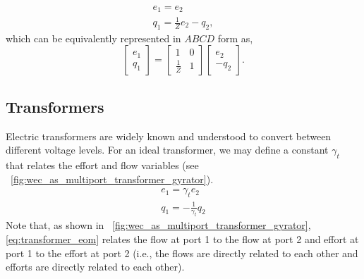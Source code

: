 \documentclass[lettersize,journal]{IEEEtran}
\begin{document}
\begin{subequations}
        \begin{gather}
                e_1 =  e_2 \\
                q_1 = \frac{1}{Z} e_2 - q_2 ,
        \end{gather}
        \label{eq:parallel_impedance_eom}%
\end{subequations}
%
which can be equivalently represented in $ABCD$ form as,
%
\begin{equation}
        \begin{bmatrix}
                e_1 \\ q_1
        \end{bmatrix}
        =
        \begin{bmatrix}
                1 & 0 \\ \frac{1}{Z} & 1
        \end{bmatrix}
        \begin{bmatrix}
                e_2 \\ - q_2
        \end{bmatrix} .
        \label{eq:parallel_impedance_abcd}
\end{equation}

\subsection{Transformers}\label{sec:trasnformers}
Electric transformers are widely known and understood to convert between different voltage levels.
For an ideal transformer, we may define a constant $\gamma_{t}$ that relates the effort and flow variables (see \figurename~\ref{fig:wec_as_multiport_transformer_gyrator}).
%
\begin{subequations}
        \begin{align}
               e_1 = \gamma_{t} e_2 \\
               q_1 = -\frac{1}{\gamma_t} q_2
        \end{align}
        \label{eq:transformer_eom}%
\end{subequations}
%
Note that, as shown in \figurename~\ref{fig:wec_as_multiport_transformer_gyrator}, \eqref{eq:transformer_eom} relates the flow at port 1 to the flow at port 2 and effort at port 1 to the effort at port 2 (i.e., the flows are directly related to each other and efforts are directly related to each other).
\end{document}

